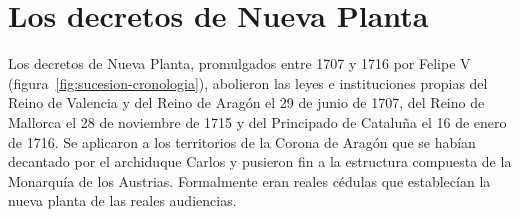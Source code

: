 \documentclass{book}
\begin{document}

\section{Los decretos de Nueva Planta}

Los decretos de Nueva Planta, promulgados entre 1707 y 1716 por Felipe V (figura~\ref{fig:sucesion-cronologia}), abolieron las leyes e instituciones propias del Reino de Valencia y del Reino de Aragón el 29 de junio de 1707, del Reino de Mallorca el 28 de noviembre de 1715 y del Principado de Cataluña el 16 de enero de 1716. Se aplicaron a los territorios de la Corona de Aragón que se habían decantado por el archiduque Carlos y pusieron fin a la estructura compuesta de la Monarquía de los Austrias. Formalmente eran reales cédulas que establecían la nueva planta de las reales audiencias.

\end{document}
